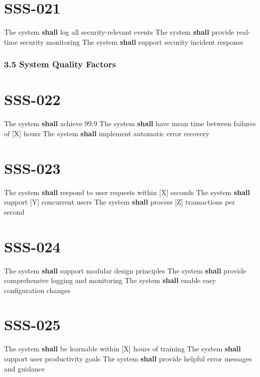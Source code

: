 \section{SSS-021}\label{SSS-021}

The system \textbf{shall} log all security-relevant events
The system \textbf{shall} provide real-time security monitoring
The system \textbf{shall} support security incident response

\subsubsection{3.5 System Quality Factors}

\section{SSS-022}\label{SSS-022}

The system \textbf{shall} achieve 99.9%
The system \textbf{shall} have mean time between failures of [X] hours
The system \textbf{shall} implement automatic error recovery

\section{SSS-023}\label{SSS-023}

The system \textbf{shall} respond to user requests within [X] seconds
The system \textbf{shall} support [Y] concurrent users
The system \textbf{shall} process [Z] transactions per second

\section{SSS-024}\label{SSS-024}

The system \textbf{shall} support modular design principles
The system \textbf{shall} provide comprehensive logging and monitoring
The system \textbf{shall} enable easy configuration changes

\section{SSS-025}\label{SSS-025}

The system \textbf{shall} be learnable within [X] hours of training
The system \textbf{shall} support user productivity goals
The system \textbf{shall} provide helpful error messages and guidance


